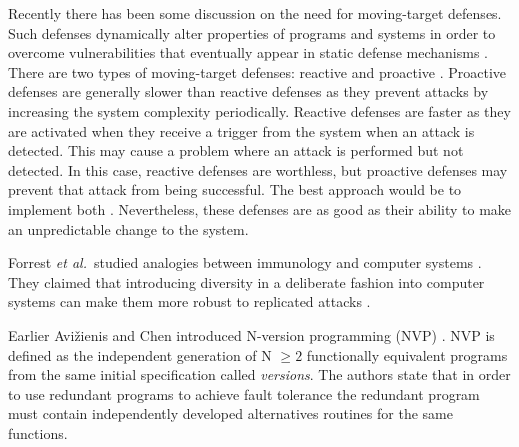 \documentclass{sig-alternate-05-2015}
\begin{document}


Recently there has been some discussion on the need for moving-target defenses. Such defenses dynamically alter properties of programs and systems in order to overcome vulnerabilities that eventually appear in static defense mechanisms \cite{Evans2011}.
There are two types of moving-target defenses: reactive and proactive \cite{Carvalho2014}. Proactive defenses are generally slower than reactive defenses as they prevent attacks by increasing the system complexity periodically. Reactive defenses are faster as they are activated when they receive a trigger from the system when an attack is detected. This may cause a problem where an attack is performed but  not detected. In this case, reactive defenses are worthless, but  proactive defenses may prevent that attack from being successful.
The best approach would be to implement both \cite{Sousa:10}.
Nevertheless, these defenses are  as good as their ability to make an unpredictable change to the system.

Forrest \emph{et al.}~studied analogies between immunology and computer systems \cite{Forrest1997}.
They claimed that introducing diversity in a deliberate fashion into computer systems can make them more robust to replicated attacks \cite{Forrest:1997:BDC:822075.822408}.


Earlier Avi\v{z}ienis and Chen introduced N-version programming (NVP) \cite{Avizienis77n-version}. NVP is defined as the independent generation of N $\geq 2$ functionally equivalent programs from the same initial specification called \textit{versions}.
%
The authors state that in order to use redundant programs to achieve fault tolerance 
the redundant program must contain independently developed alternatives routines for the same functions.
\end{document}
